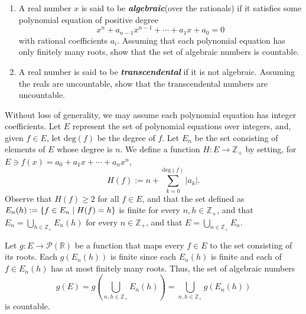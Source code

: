 \documentclass[a4paper,12pt]{article}
\begin{document}
\begin{exe}\leavevmode \par
	\begin{enumerate}
		\item
		      A real number \( x \) is said to be \textbf{\textit{algebraic}}(over the rationals)
		      if it satisfies some polynomial equation of positive degree
		      \begin{equation*}
			      x^n + a_{n-1}x^{n-1}+\cdots+a_1x + a_0 = 0
		      \end{equation*}
		      with rational coefficients \( a_i \).
		      Assuming that each polynomial equation has only finitely many roots,
		      show that the set of algebraic numbers is countable.
		      
		\item
		      A real number is said to be \textbf{\textit{transcendental}}
		      if it is not algebraic.
		      Assuming the reals are uncountable,
		      show that the transcendental numbers are uncountable.
	\end{enumerate}
\end{exe}\begin{sol}\leavevmode \par
	Without loss of generality, we may assume each polynomial equation has integer coefficients.
	Let \( E \) represent the set of polynomial equations over integers,
	and, given \( f \in E \), let \( \mathrm{deg}(f) \) be the degree of \( f \).
	Let \( E_n \) be the set consisting of elements of \( E \) whose degree is \( n \).
	We define a function \( H : E \to \mathbb{Z}_{+}\) by setting,
	for
	\( E \ni f(x)=a_0 + a_1 x +\cdots +a_n x^n \),
	\begin{equation*}
		H(f):=n+\sum_{k=0}^{\mathrm{deg}(f)}|a_k|.
	\end{equation*}
	Observe that
	\( H(f) \ge 2\) for all \( f \in E \), 
	and that the set defined as
	\( E_n(h):=\left\{ f\in E_n \;|\; H(f)=h \right\} \)
	is finite for every
	\( n, h \in \mathbb{Z}_{+} \),
	and that \( E_n=\bigcup_{h\in \mathbb{Z}_{+}}E_n(h) \)
	for every
	\( n \in \mathbb{Z}_{+} \),
	and that
	\( E=\bigcup_{n \in \mathbb{Z}_{+}}E_n \).
	
	Let \( g:E \to \mathcal{P}(\mathbb{R}) \) be a function that maps every \( f \in E \) to the set consisting of its roots.
	Each \( g(E_n(h)) \) is finite
	since each \( E_n(h) \) is finite and each of \( f \in E_n(h) \) has at most finitely many roots.
	Thus,
	the set of algebraic numbers
	\begin{equation*}
		g(E)
		=
		g \left( \bigcup_{n,h \in \mathbb{Z}_{+}}E_n(h) \right)
		=
		\bigcup_{n,h \in \mathbb{Z}_{+}}g(E_n(h))
	\end{equation*}
	is countable.
	

\end{sol}
\end{document}

